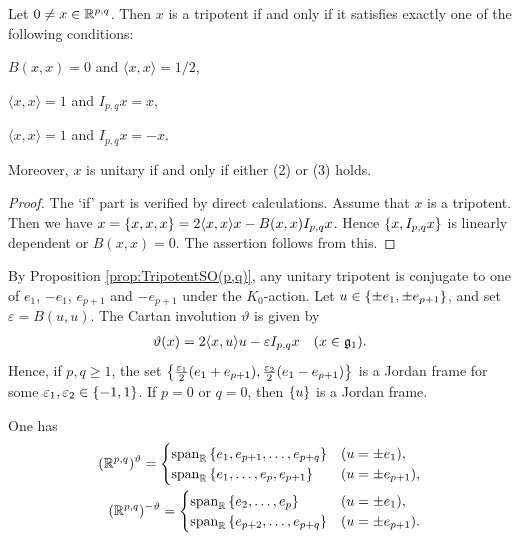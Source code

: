 \begin{proposition} \label{prop:TripotentSO(p,q)}
	Let $0\neq x \in \mathbb{R}^{p,q}$.
	Then $x$ is a tripotent if and only if it satisfies exactly one of the following conditions:
	\begin{enumparen}
		\item $B(x, x) = 0$ and $\langle x, x \rangle = 1/2$,
		\item $\langle x, x \rangle = 1$ and $I_{p,q}x = x$,
		\item $\langle x, x \rangle = 1$ and $I_{p,q}x = -x$.
	\end{enumparen}
	Moreover, $x$ is unitary if and only if either (2) or (3) holds.
\end{proposition}

\begin{proof}
	The `if' part is verified by direct calculations.
	Assume that $x$ is a tripotent.
	Then we have $x = \{x, x, x\} = 2\langle x, x \rangle x - B(x, x)I_{p,q}x$.
	Hence $\left\{x, I_{p,q}x \right\}$ is linearly dependent or $B(x, x)=0$.
	The assertion follows from this.
\end{proof}

By Proposition \ref{prop:TripotentSO(p,q)}, any unitary tripotent is conjugate to one of $e_1$, $-e_1$, $e_{p+1}$ and $-e_{p+1}$ under the $K_0$-action.
Let $u \in \left\{\pm e_1, \pm e_{p+1} \right\}$, and set $\varepsilon = B(u, u)$.
The Cartan involution $\vartheta$ is given by
\begin{align*}
	\vartheta(x) = 2\langle x, u \rangle u - \varepsilon I_{p,q}x \quad (x \in \mathfrak{g}_1).
\end{align*}
Hence, if $p, q\geq 1$, the set $\left\{\frac{\varepsilon_1}{2}(e_1 + e_{p+1}), \frac{\varepsilon_2}{2}(e_1 - e_{p+1}) \right\}$ is a Jordan frame for some $\varepsilon_1, \varepsilon_2 \in \left\{-1, 1 \right\}$.
If $p = 0$ or $q = 0$, then $\left\{u \right\}$ is a Jordan frame.

\begin{lemma} \label{lem:InvolutionSO(1,k)}
	One has
	\begin{align*}
		(\mathbb{R}^{p, q})^{\vartheta} = \begin{cases}
			\mathrm{span}_{\mathbb{R}}\left\{e_1, e_{p+1}, \ldots, e_{p+q}\right\} & (u=\pm e_1), \\
			\mathrm{span}_{\mathbb{R}}\left\{e_1, \ldots, e_p, e_{p+1}\right\} & (u=\pm e_{p+1}),
		\end{cases} \\
		(\mathbb{R}^{p,q})^{-\vartheta} = \begin{cases}
			\mathrm{span}_{\mathbb{R}}\left\{e_2, \ldots, e_p\right\} & (u=\pm e_1), \\
			\mathrm{span}_{\mathbb{R}}\left\{e_{p+2}, \ldots, e_{p+q}\right\} & (u=\pm e_{p+1}).
		\end{cases}
	\end{align*}
\end{lemma}

